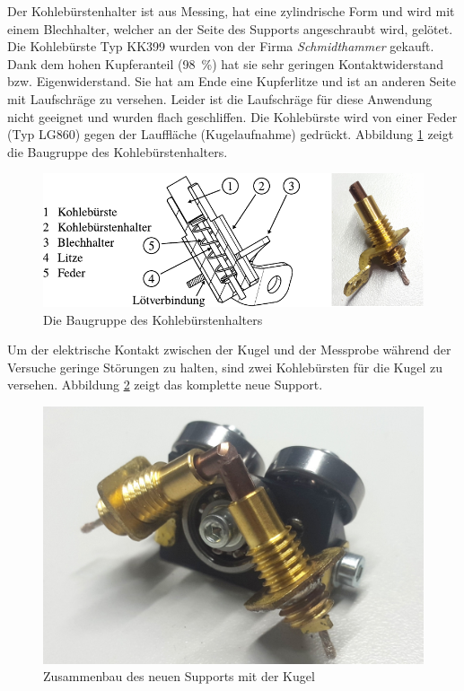 Der Kohlebürstenhalter ist aus Messing, hat eine zylindrische Form und wird mit einem Blechhalter, welcher an der Seite des Supports angeschraubt wird, gelötet.
Die Kohlebürste Typ KK399 wurden von der Firma \textit{Schmidthammer} gekauft.
Dank dem hohen Kupferanteil (\SI{98}{\percent}) hat sie sehr geringen Kontaktwiderstand bzw. Eigenwiderstand.
Sie hat am Ende eine Kupferlitze und ist an anderen Seite mit Laufschräge zu versehen.
Leider ist die Laufschräge für diese Anwendung nicht geeignet und wurden flach geschliffen.
Die Kohlebürste wird von einer Feder (Typ LG860) gegen der Lauffläche (Kugelaufnahme) gedrückt.
Abbildung \ref{fig:die_baugruppe_des_kohlebuerstenhalters} zeigt die Baugruppe des Kohlebürstenhalters.
\begin{figure}[htb]
    \centering
    \includegraphics[]{./images/kohlebuerstenhalter_asm.pdf}
    \caption{Die Baugruppe des Kohlebürstenhalters}
    \label{fig:die_baugruppe_des_kohlebuerstenhalters}
\end{figure}
%

Um der elektrische Kontakt zwischen der Kugel und der Messprobe während der Versuche geringe Störungen zu halten, sind zwei Kohlebürsten für die Kugel zu versehen.
Abbildung \ref{fig:das_komplette_kugelsupports} zeigt das komplette neue Support.
\begin{figure}[htb]
    \centering
    \includegraphics[width=0.5\linewidth]{./images/kugelsupport_full.jpg}
    \caption{Zusammenbau des neuen Supports mit der Kugel}
    \label{fig:das_komplette_kugelsupports}
\end{figure}
%

